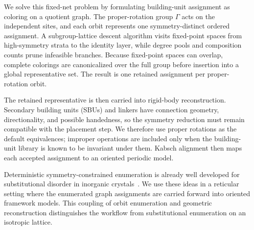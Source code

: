 \documentclass[pdflatex,sn-mathphys-num]{sn-jnl}
\theoremstyle{thmstyleone}%
\begin{document}
We solve this fixed-net problem by formulating building-unit assignment as coloring on a quotient graph. The proper-rotation group $\Gamma$ acts on the independent sites, and each orbit represents one symmetry-distinct ordered assignment. A subgroup-lattice descent algorithm visits fixed-point spaces from high-symmetry strata to the identity layer, while degree pools and composition counts prune infeasible branches. Because fixed-point spaces can overlap, complete colorings are canonicalized over the full group before insertion into a global representative set. The result is one retained assignment per proper-rotation orbit.

The retained representative is then carried into rigid-body reconstruction. Secondary building units (SBUs) and linkers have connection geometry, directionality, and possible handedness, so the symmetry reduction must remain compatible with the placement step. We therefore use proper rotations as the default equivalences; improper operations are included only when the building-unit library is known to be invariant under them. Kabsch alignment then maps each accepted assignment to an oriented periodic model.

Deterministic symmetry-constrained enumeration is already well developed for substitutional disorder in inorganic crystals~\cite{mckay1998isomorph, mckay2014practical, hart2008algorithm, hart2009generating, hart2012generating, morgan2017generating}. We use these ideas in a reticular setting where the enumerated graph assignments are carried forward into oriented framework models. This coupling of orbit enumeration and geometric reconstruction distinguishes the workflow from substitutional enumeration on an isotropic lattice.
\end{document}
